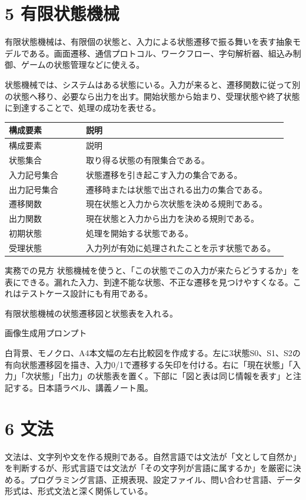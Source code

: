 \documentclass[uplatex,dvipdfmx,a4paper,10pt]{jsarticle}
\begin{document}
\section{5 有限状態機械}
有限状態機械は、有限個の状態と、入力による状態遷移で振る舞いを表す抽象モデルである。画面遷移、通信プロトコル、ワークフロー、字句解析器、組込み制御、ゲームの状態管理などに使える。

状態機械では、システムはある状態にいる。入力が来ると、遷移関数に従って別の状態へ移り、必要なら出力を出す。開始状態から始まり、受理状態や終了状態に到達することで、処理の成功を表せる。

\begin{longtable}{>{\raggedright\arraybackslash}p{0.26\linewidth} >{\raggedright\arraybackslash}p{0.68\linewidth}}
\toprule
構成要素 & 説明 \\
\midrule
\endfirsthead
\toprule
構成要素 & 説明 \\
\midrule
\endhead
状態集合 & 取り得る状態の有限集合である。 \\
入力記号集合 & 状態遷移を引き起こす入力の集合である。 \\
出力記号集合 & 遷移時または状態で出される出力の集合である。 \\
遷移関数 & 現在状態と入力から次状態を決める規則である。 \\
出力関数 & 現在状態と入力から出力を決める規則である。 \\
初期状態 & 処理を開始する状態である。 \\
受理状態 & 入力列が有効に処理されたことを示す状態である。 \\
\bottomrule
\end{longtable}
\begin{infobox}{実務での見方}
状態機械を使うと、「この状態でこの入力が来たらどうするか」を表にできる。漏れた入力、到達不能な状態、不正な遷移を見つけやすくなる。これはテストケース設計にも有用である。
\end{infobox}
\begin{todobox}
有限状態機械の状態遷移図と状態表を入れる。

画像生成用プロンプト

白背景、モノクロ、A4本文幅の左右比較図を作成する。左に3状態S0、S1、S2の有向状態遷移図を描き、入力0/1で遷移する矢印を付ける。右に「現在状態」「入力」「次状態」「出力」の状態表を置く。下部に「図と表は同じ情報を表す」と注記する。日本語ラベル、講義ノート風。
\end{todobox}
\section{6 文法}
文法は、文字列や文を作る規則である。自然言語では文法が「文として自然か」を判断するが、形式言語では文法が「その文字列が言語に属するか」を厳密に決める。プログラミング言語、正規表現、設定ファイル、問い合わせ言語、データ形式は、形式文法と深く関係している。
\end{document}

